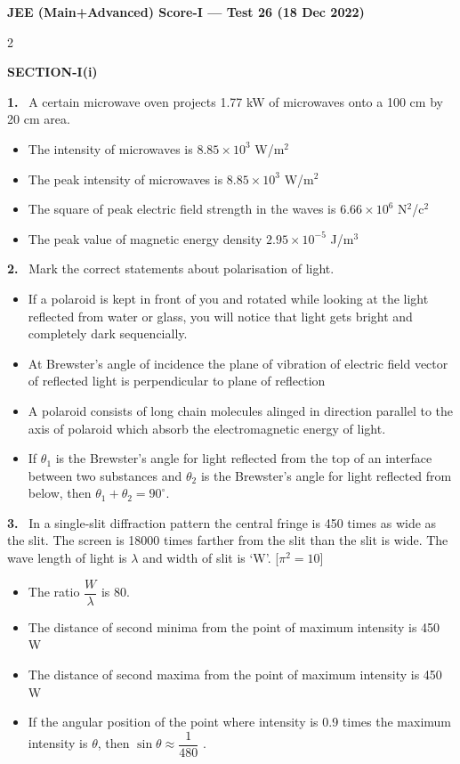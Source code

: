 \documentclass[10pt]{extarticle}
\newcommand{\papersec}[1]{\par\bigskip{\centering\Large\bfseries PAPER-#1\par}\medskip}
\newcommand{\partsec}[2]{\par\medskip\noindent{\large\bfseries PART-#1: #2}\par\smallskip}
\newcommand{\sect}[1]{\par\smallskip\noindent\textbf{#1}\par}
\newcommand{\qn}[1]{\par\smallskip\noindent\textbf{#1.}~}
\newenvironment{qoptions}{\begin{itemize}[leftmargin=1.8em,itemsep=1pt,topsep=2pt,label={}]}{\end{itemize}}
\newcommand{\opt}[2]{\item[(#1)] #2}
\begin{document}
\begin{center}{\Large\bfseries JEE (Main+Advanced) Score-I --- Test 26 (18 Dec 2022)}\end{center}
\raggedcolumns
\setlength{\tabcolsep}{3pt}
\begin{multicols}{2}
\papersec{1}
\partsec{1}{PHYSICS}
\sect{SECTION-I(i)}
\qn{1} A certain microwave oven projects 1.77 kW of microwaves onto a 100 cm by 20 cm area.
\begin{qoptions}
\opt{A}{The intensity of microwaves is $8.85\times10^{3}$ W/m$^2$}
\opt{B}{The peak intensity of microwaves is $8.85\times10^{3}$ W/m$^2$}
\opt{C}{The square of peak electric field strength in the waves is $6.66\times10^{6}$ N$^2$/c$^2$}
\opt{D}{The peak value of magnetic energy density $2.95\times10^{-5}$ J/m$^3$}
\end{qoptions}

\qn{2} Mark the correct statements about polarisation of light.
\begin{qoptions}
\opt{A}{If a polaroid is kept in front of you and rotated while looking at the light reflected from water or glass, you will notice that light gets bright and completely dark sequencially.}
\opt{B}{At Brewster's angle of incidence the plane of vibration of electric field vector of reflected light is perpendicular to plane of reflection}
\opt{C}{A polaroid consists of long chain molecules alinged in direction parallel to the axis of polaroid which absorb the electromagnetic energy of light.}
\opt{D}{If $\theta_1$ is the Brewster's angle for light reflected from the top of an interface between two substances and $\theta_2$ is the Brewster's angle for light reflected from below, then $\theta_1+\theta_2=90^\circ$.}
\end{qoptions}

\qn{3} In a single-slit diffraction pattern the central fringe is 450 times as wide as the slit. The screen is 18000 times farther from the slit than the slit is wide. The wave length of light is $\lambda$ and width of slit is `W'. [$\pi^2=10$]
\begin{qoptions}
\opt{A}{The ratio $\dfrac{W}{\lambda}$ is 80.}
\opt{B}{The distance of second minima from the point of maximum intensity is 450 W}
\opt{C}{The distance of second maxima from the point of maximum intensity is 450 W}
\opt{D}{If the angular position of the point where intensity is 0.9 times the maximum intensity is $\theta$, then $\sin\theta\approx\dfrac{1}{480}$ .}
\end{qoptions}


\end{multicols}
\end{document}
